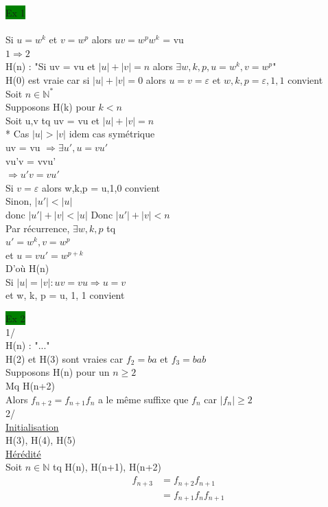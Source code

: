 \documentclass{article}
\begin{document}
\noindent
\colorbox{green}{Ex 1}\\
\\
Si \(u = w^k\) et \(v=w^p\) alors \(uv = w^p w^k\) = vu \\
\underline{\(1 \Rightarrow 2\)}\\
H(n) : "Si uv = vu et \(|u|+|v| = n\) alors \(\exists w, k, p, u = w^k, v = w^p\)"\\
H(0) est vraie car si \(|u| + |v| = 0\) alors \(u = v = \varepsilon\)
et \(w,k,p = \varepsilon, 1, 1\) convient\\
Soit \(n \in \mathbb{N}^*\)\\
Supposons H(k) pour \(k < n\)\\
Soit u,v tq uv = vu et \(|u| + |v| = n\)\\
* Cas  \(|u| > |v|\) idem cas symétrique\\
uv = vu \(\Rightarrow \exists u', u = vu'\)\\
vu'v = vvu'\\
\(\Rightarrow u'v = vu'\)\\
Si \(v = \varepsilon\) alors w,k,p = u,1,0 convient\\
Sinon, \(|u'| < |u|\)\\
donc \(|u'| + |v| < |u|\)
Donc \(|u'| + |v| < n\)\\
Par récurrence, \(\exists w,k,p\) tq \\
\(u'=w^k, v = w^p\)\\
et \(u = vu' = w^{p+k}\)\\
D'où H(n)\\
Si \(|u| = |v| : uv = vu \Rightarrow u = v\)\\
et w, k, p = u, 1, 1 convient 

\noindent \colorbox{green}{Ex 2}\\
1/\\
H(n) : "..."\\
H(2) et H(3) sont vraies car \(f_2 = ba\) et \(f_3 = bab\)\\
Supposons H(n) pour un \(n \geq 2\)\\
Mq H(n+2)\\
Alors \(f_{n+2} = f_{n+1}f_n\) a le même suffixe que \(f_n\) car
\(|f_n| \geq 2\)\\
2/\\
\underline{Initialisation}\\
H(3), H(4), H(5)\\
\underline{Hérédité}\\
Soit \(n \in \mathbb{N}\) tq H(n), H(n+1), H(n+2)\\
\begin{align*}
    f_{n+3} &= f_{n+2}f_{n+1}\\
    &= f_{n+1}f_n f_{n+1}
\end{align*}
\end{document}
